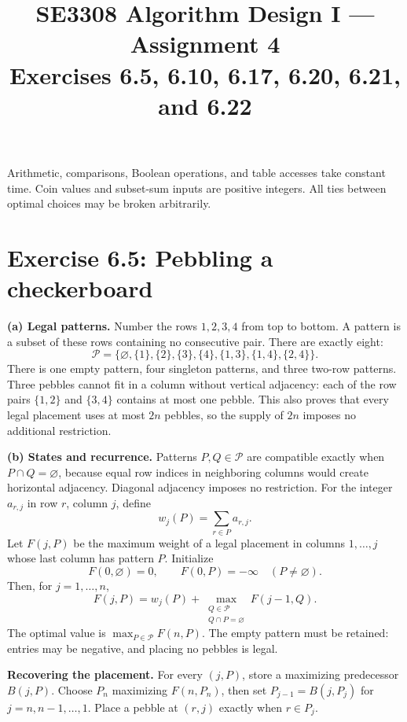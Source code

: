 \documentclass[11pt]{article}
\title{SE3308 Algorithm Design I --- Assignment 4\\[0.3em]
\large Exercises 6.5, 6.10, 6.17, 6.20, 6.21, and 6.22}
\author{\studentname\quad\studentid}
\date{}
\newcommand{\exercise}[2]{\section*{Exercise #1: #2}}
\begin{document}
\maketitle
\vspace{-1em}
Arithmetic, comparisons, Boolean operations, and table accesses take constant
time. Coin values and subset-sum inputs are positive integers.
All ties between optimal choices may be broken arbitrarily.

\exercise{6.5}{Pebbling a checkerboard}
\textbf{(a) Legal patterns.}
Number the rows $1,2,3,4$ from top to bottom. A pattern is a subset of
these rows containing no consecutive pair. There are exactly eight:
\[
 \mathcal P=\bigl\{\varnothing,\{1\},\{2\},\{3\},\{4\},
                    \{1,3\},\{1,4\},\{2,4\}\bigr\}.
\]
There is one empty pattern, four singleton patterns, and three two-row
patterns. Three pebbles cannot fit in a column without vertical adjacency:
each of the row pairs $\{1,2\}$ and $\{3,4\}$ contains at most one pebble.
This also proves that every legal placement uses at most $2n$ pebbles,
so the supply of $2n$ imposes no additional restriction.

\textbf{(b) States and recurrence.}
Patterns $P,Q\in\mathcal P$ are compatible exactly when
$P\cap Q=\varnothing$, because equal row indices in neighboring columns
would create horizontal adjacency. Diagonal adjacency imposes no restriction.
For the integer $a_{r,j}$ in row $r$, column $j$, define
\[
 w_j(P)=\sum_{r\in P}a_{r,j}.
\]
Let $F(j,P)$ be the maximum weight of a legal placement in columns
$1,\ldots,j$ whose last column has pattern $P$. Initialize
\[
 F(0,\varnothing)=0,\qquad
 F(0,P)=-\infty\quad(P\ne\varnothing).
\]
Then, for $j=1,\ldots,n$,
\[
 \boxed{F(j,P)=w_j(P)+
    \max_{\substack{Q\in\mathcal P\\Q\cap P=\varnothing}}F(j-1,Q).}
\]
The optimal value is $\max_{P\in\mathcal P}F(n,P)$. The empty pattern
must be retained: entries may be negative, and placing no pebbles is legal.

\textbf{Recovering the placement.}
For every $(j,P)$, store a maximizing predecessor $B(j,P)$.
Choose $P_n$ maximizing $F(n,P_n)$, then set
$P_{j-1}=B(j,P_j)$ for $j=n,n-1,\ldots,1$.
Place a pebble at $(r,j)$ exactly when $r\in P_j$.

\newpage
\end{document}
